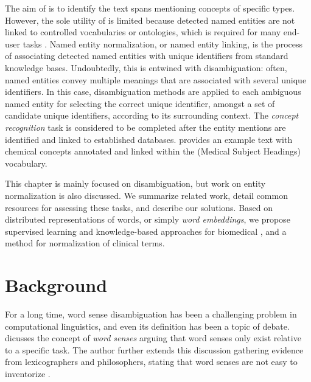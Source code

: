

The aim of  is to identify the text spans mentioning concepts of specific types. However, the sole utility of  is limited because detected named entities are not linked to controlled vocabularies or ontologies, which is required for many end-user tasks \parencite{leaman2016b}.
Named entity normalization, or named entity linking, is the process of associating detected named entities with unique identifiers from standard knowledge bases.
Undoubtedly, this is entwined with disambiguation: often, named entities convey multiple meanings that are associated with several unique identifiers.
In this case, disambiguation methods are applied to each ambiguous named entity for selecting the correct unique identifier, amongst a set of candidate unique identifiers, according to its surrounding context.
The \textit{concept recognition} task is considered to be completed after the entity mentions are identified and linked to established databases.
 provides an example text with chemical concepts annotated and linked within the  (Medical Subject Headings) vocabulary.



This chapter is mainly focused on disambiguation, but work on entity normalization is also  discussed.
We summarize related work, detail common resources for assessing these tasks, and describe our solutions.
Based on distributed representations of words, or simply \textit{word embeddings}, we propose supervised learning and knowledge-based approaches for biomedical , and a method for normalization of clinical terms.


\section{Background}

For a long time, word sense disambiguation has been a challenging problem in computational linguistics, and even its definition has been a topic of debate.
\textcite{kilgarriff1997a} dicusses the concept of \textit{word senses} arguing that word senses only exist relative to a specific task.
The author further extends this discussion gathering evidence from lexicographers and philosophers, stating that word senses are not easy to inventorize \parencite{kilgarriff2007a}.

